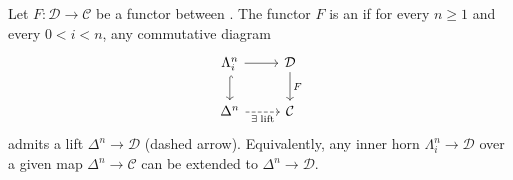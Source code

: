 \begin{definition} \label{definition:inner_fibration_between_infinity_categories}
Let $F : \mathcal{D} \to \mathcal{C}$ be a functor between . The functor $F$ is an  if for every $n \geq 1$ and every $0 < i < n$, any commutative diagram
\[
\begin{tikzcd}
\Lambda_i^n \arrow[r] \arrow[d, hook] & \mathcal{D} \arrow[d, "F"] \\
\Delta^n \arrow[r, dashed, "\exists\;\text{lift}"'] & \mathcal{C}
\end{tikzcd}
\]
admits a lift $\Delta^n \to \mathcal{D}$ (dashed arrow). Equivalently, any inner horn $\Lambda_i^n \to \mathcal{D}$ over a given map $\Delta^n \to \mathcal{C}$ can be extended to $\Delta^n \to \mathcal{D}$.
\end{definition}
